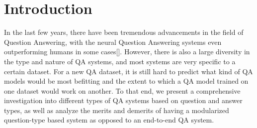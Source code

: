 


\section{Introduction}


In the last few years, there have been tremendous advancements in the field of Question Answering, with the neural Question Answering systems even outperforming humans in some cases[\cite{msmarco}]. However, there is also a large diversity in the type and nature of QA systems, and most systems are very specific to a certain dataset. For a new QA dataset, it is still hard to predict what kind of QA models would be most befitting and the extent to which a QA model trained on one dataset would work on another.  To that end, we present a comprehensive investigation into different types of QA systems based on question and answer types, as well as analyze the merits and demerits of having a modularized question-type based system as opposed to an end-to-end QA system. 

